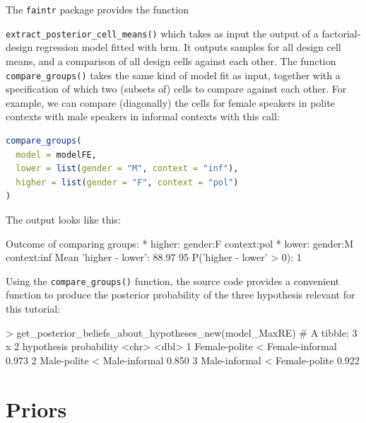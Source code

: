 \documentclass[nobib]{tufte-handout}
\begin{document}
The \texttt{faintr} package provides the function 

\texttt{extract\_posterior\_cell\_means()}
which takes as input the output of a factorial-design regression model fitted with
\textrm{brm}. It outputs samples for all design cell means, and a comparison of all design
cells against each other. The function \texttt{compare\_groups()} takes the same kind of model
fit as input, together with a specification of which two (subsets of) cells to compare against
each other. For example, we can compare (diagonally) the cells for female speakers in polite
contexts with male speakers in informal contexts with this call:

\begin{minipage}[]{1.3\textwidth}
\begin{lstlisting}[language=R]
compare_groups(
  model = modelFE, 
  lower = list(gender = "M", context = "inf"),
  higher = list(gender = "F", context = "pol")
)
\end{lstlisting}
\end{minipage}

The output looks like this:

\medskip

\begin{minipage}[]{\textwidth}
\begin{rc}
Outcome of comparing groups:
 * higher:  gender:F context:pol 
 * lower:   gender:M context:inf 
Mean 'higher - lower':  88.97 
95%
P('higher - lower' > 0):  1 
\end{rc}
\end{minipage}

Using the \texttt{compare\_groups()} function, the source code provides a convenient function to
produce the posterior probability of the three hypothesis relevant for this tutorial:

\medskip

\begin{minipage}[]{\textwidth}
\begin{rc}
> get_posterior_beliefs_about_hypotheses_new(model_MaxRE)
# A tibble: 3 x 2
  hypothesis                      probability
  <chr>                                 <dbl>
1 Female-polite < Female-informal       0.973
2 Male-polite < Male-informal           0.850
3 Male-informal < Female-polite         0.922
\end{rc}
\end{minipage}

\section{Priors}
\end{document}

